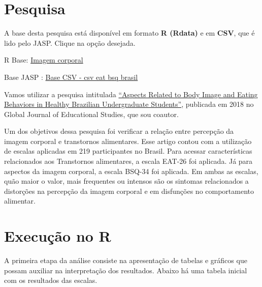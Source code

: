 \documentclass[
]{book}
\newenvironment{Shaded}{\begin{snugshade}}{\end{snugshade}}
\newcommand{\DataTypeTok}[1]{\textcolor[rgb]{0.13,0.29,0.53}{#1}}
\newcommand{\KeywordTok}[1]{\textcolor[rgb]{0.13,0.29,0.53}{\textbf{#1}}}
\newcommand{\NormalTok}[1]{#1}
\newcommand{\OperatorTok}[1]{\textcolor[rgb]{0.81,0.36,0.00}{\textbf{#1}}}
\newcommand{\OtherTok}[1]{\textcolor[rgb]{0.56,0.35,0.01}{#1}}
\newcommand{\StringTok}[1]{\textcolor[rgb]{0.31,0.60,0.02}{#1}}
\newenvironment{base}{
  \definecolor{shadecolor}{rgb}{0.972,0.972,0.972}  %
  \color{black}
  \begin{shaded}}
 {\end{shaded}}
\begin{document}
\hypertarget{pesquisa-8}{%
\section{Pesquisa}\label{pesquisa-8}}

\begin{base}
A base desta pesquisa está disponível em formato \textbf{R (Rdata)} e em \textbf{CSV}, que é lido pelo JASP. Clique na opção desejada.

R Base: \href{https://github.com/anovabr/mqt/raw/master/bases/Base\%20R\%20-\%20imagem\%20corporal.RData}{Imagem corporal}

Base JASP : \href{https://github.com/anovabr/mqt/raw/master/bases/bases_csv_jasp.zip}{Base CSV - csv eat bsq brasil}

\end{base}

Vamos utilizar a pesquisa intitulada \href{https://www.researchgate.net/publication/323729370_Aspects_Related_to_Body_Image_and_Eating_Behaviors_in_Healthy_Brazilian_Undergraduate_Students}{``Aspects Related to Body Image and Eating Behaviors in Healthy Brazilian Undergraduate Students''}, publicada em 2018 no Global Journal of Educational Studies, que sou coautor.

Um dos objetivos dessa pesquisa foi verificar a relação entre percepção da imagem corporal e transtornos alimentares. Esse artigo contou com a utilização de escalas aplicadas em 219 participantes no Brasil. Para acessar características relacionados aos Transtornos alimentares, a escala EAT-26 foi aplicada. Já para aspectos da imagem corporal, a escala BSQ-34 foi aplicada. Em ambas as escalas, quão maior o valor, mais frequentes ou intensos são os sintomas relacionados a distorções na percepção da imagem corporal e em disfunções no comportamento alimentar.

\hypertarget{execuuxe7uxe3o-no-r-13}{%
\section{Execução no R}\label{execuuxe7uxe3o-no-r-13}}

A primeira etapa da análise consiste na apresentação de tabelas e gráficos que possam auxiliar na interpretação dos resultados. Abaixo há uma tabela inicial com os resultados das escalas.

\begin{Shaded}
\end{Shaded}
\end{document}
